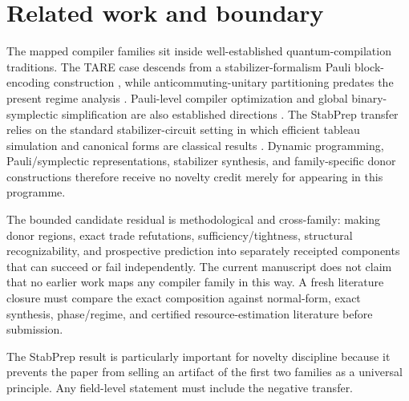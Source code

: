 \section{Related work and boundary}

The mapped compiler families sit inside well-established quantum-compilation traditions. The TARE case descends from a stabilizer-formalism Pauli block-encoding construction \cite{schillo2026blockencoding}, while anticommuting-unitary partitioning predates the present regime analysis \cite{izmaylov2020unitary}. Pauli-level compiler optimization and global binary-symplectic simplification are also established directions \cite{paykin2023pcoast,yang2026symphony}. The StabPrep transfer relies on the standard stabilizer-circuit setting in which efficient tableau simulation and canonical forms are classical results \cite{aaronson2004stabilizer}. Dynamic programming, Pauli/symplectic representations, stabilizer synthesis, and family-specific donor constructions therefore receive no novelty credit merely for appearing in this programme.

The bounded candidate residual is methodological and cross-family: making donor regions, exact trade refutations, sufficiency/tightness, structural recognizability, and prospective prediction into separately receipted components that can succeed or fail independently. The current manuscript does not claim that no earlier work maps any compiler family in this way. A fresh literature closure must compare the exact composition against normal-form, exact synthesis, phase/regime, and certified resource-estimation literature before submission.

The StabPrep result is particularly important for novelty discipline because it prevents the paper from selling an artifact of the first two families as a universal principle. Any field-level statement must include the negative transfer.